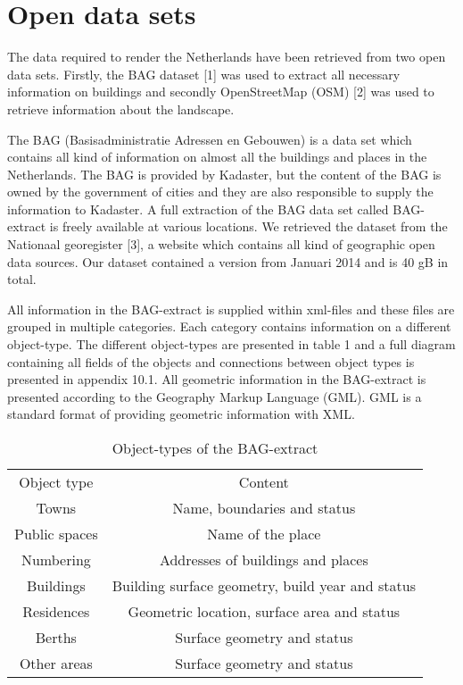 \chapter{Open data sets}
The data required to render the Netherlands have been retrieved from two open data sets. Firstly, the BAG dataset [1] was used to extract all necessary information on buildings and secondly OpenStreetMap (OSM) [2] was used to retrieve information about the landscape.

The BAG (Basisadministratie Adressen en Gebouwen) is a data set which contains all kind of information on almost all the buildings and places in the Netherlands. The BAG is provided by Kadaster, but the content of the BAG is owned by the government of cities and they are also responsible to supply the information to Kadaster. A full extraction of the BAG data set called BAG-extract is freely available at various locations. We retrieved the dataset from the Nationaal georegister [3], a website which contains all kind of geographic open data sources. Our dataset contained a version from Januari 2014 and is 40 gB in total.

All information in the BAG-extract is supplied within xml-files and these files are grouped in multiple categories. Each category contains information on a different object-type. The different object-types are presented in table 1 and a full diagram containing all fields of the objects and connections between object types is presented in appendix 10.1. All geometric information in the BAG-extract is presented according to the Geography Markup Language (GML). GML is a standard format of providing geometric information with XML.

\begin{table}
    \begin{tabular}{cc}
      Object type & Content     \\
      Towns & Name, boundaries and status  \\
      Public spaces & Name of the place  \\
      Numbering & Addresses of buildings and places  \\
      Buildings & Building surface geometry, build year and status  \\
      Residences & Geometric location, surface area and status  \\
      Berths & Surface geometry and status  \\
      Other areas & Surface geometry and status \\
    \end{tabular}
    \caption{Object-types of the BAG-extract}
    \label{Table:ObjectTypesBAG}
\end{table}


